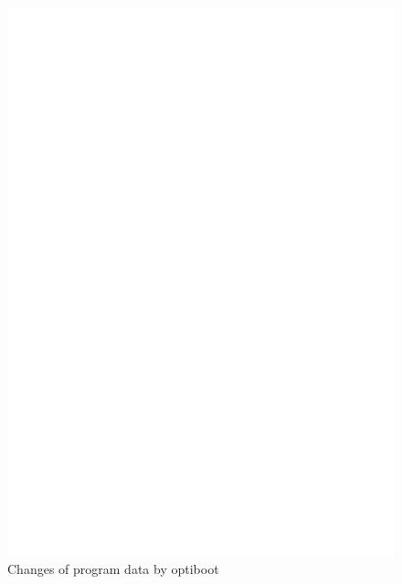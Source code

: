 \begin{figure}[H]
\centering
\includegraphics[]{../FIG/VectorMove.eps}
\caption{Changes of program data by optiboot}
\label{fig:VectorMove}
\end{figure}

